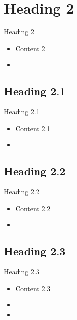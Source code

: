 \documentclass{sintefbeamer}
\begin{document}
\section{Heading 2}

\begin{frame}{Heading 2}
    \begin{itemize}
        \item Content 2
        \item 
    \end{itemize}
\end{frame}

\subsection{Heading 2.1}

\begin{frame}{Heading 2.1}
    \begin{itemize}
        \item Content 2.1
        \item 
    \end{itemize}
\end{frame}

\subsection{Heading 2.2}

\begin{frame}{Heading 2.2}
    \begin{itemize}
        \item Content 2.2
        \item 
    \end{itemize}
\end{frame}

\subsection{Heading 2.3}

\begin{frame}{Heading 2.3}
    \begin{itemize}
        \item Content 2.3
        \item 
        \item 
    \end{itemize}
\end{frame}

\backmatter
\end{document}
